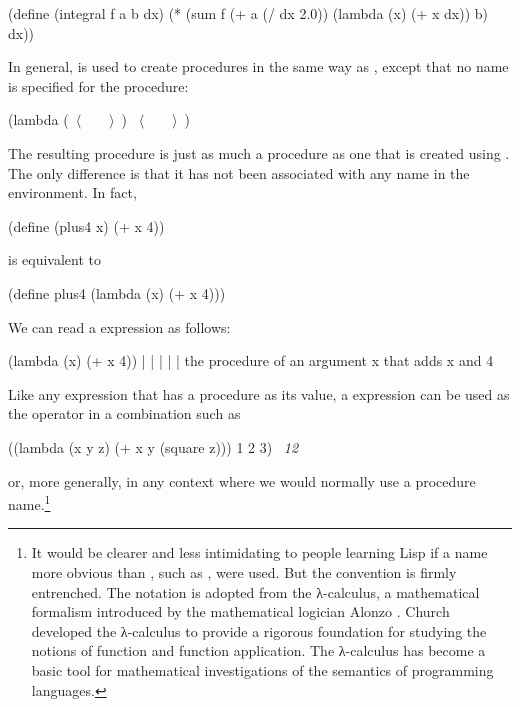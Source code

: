 \begin{codeBlock}
(define (integral f a b dx)
  (* (sum f
          (+ a (/ dx 2.0))
          (lambda (x) (+ x dx))
          b)
     dx))
\end{codeBlock}

\noindent
In general,  is used to create procedures in the same way as
, except that no name is specified for the procedure:

\begin{codeBlock}
(lambda (~\(\langle \)~~~~\(\rangle \)~) ~\(\langle \)~~~~\(\rangle \)~)
\end{codeBlock}

\noindent
The resulting procedure is just as much a procedure as one that is created
using .  The only difference is that it has not been associated
with any name in the environment.  In fact,

\begin{codeBlock}
(define (plus4 x) (+ x 4))
\end{codeBlock}

\noindent
is equivalent to

\begin{codeBlock}
(define plus4 (lambda (x) (+ x 4)))
\end{codeBlock}

\noindent
We can read a  expression as follows:

\begin{codeBlock}
(lambda                     (x)     (+   x     4))
    |                        |       |   |     |
the procedure of an argument x that adds x and 4
\end{codeBlock}

\noindent
Like any expression that has a procedure as its value, a 
expression can be used as the operator in a combination such as

\begin{codeBlock}
((lambda (x y z) (+ x y (square z)))
 1 2 3)
~\textit{12}~
\end{codeBlock}

\noindent
or, more generally, in any context where we would normally use a procedure
name.\footnote{It would be clearer and less intimidating to people learning
Lisp if a name more obvious than , such as ,
were used.  But the convention is firmly entrenched.  The notation is adopted
from the λ-calculus, a mathematical formalism introduced by the
mathematical logician Alonzo .  Church developed the
λ-calculus to provide a rigorous foundation for studying the
notions of function
and function application.  The λ-calculus has become a basic tool
for mathematical investigations of the semantics of programming languages.}

